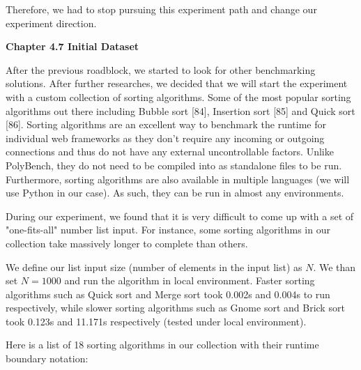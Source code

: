Therefore, we had to stop pursuing this experiment path and change our experiment direction.

\bigskip
\textbf{{\Large Chapter 4.7 Initial Dataset}}

After the previous roadblock, we started to look for other benchmarking solutions. After further researches, we decided that we will start the experiment with a custom collection of sorting algorithms. Some of the most popular sorting algorithms out there including Bubble sort [84], Insertion sort [85] and Quick sort [86]. Sorting algorithms are an excellent way to benchmark the runtime for individual web frameworks as they don't require any incoming or outgoing connections and thus do not have any external uncontrollable factors. Unlike PolyBench, they do not need to be compiled into as standalone files to be run. Furthermore, sorting algorithms are also available in multiple languages (we will use Python in our case). As such, they can be run in almost any environments.

During our experiment, we found that it is very difficult to come up with a set of "one-fits-all" number list input. For instance, some sorting algorithms in our collection take massively longer to complete than others.

We define our list input size (number of elements in the input list) as \(N\). We than set \(N = 1000\) and run the algorithm in local environment. Faster sorting algorithms such as Quick sort and Merge sort took 0.002s and 0.004s to run respectively, while slower sorting algorithms such as Gnome sort and Brick sort took 0.123s and 11.171s respectively (tested under local environment).

Here is a list of 18 sorting algorithms in our collection with their runtime boundary notation:

